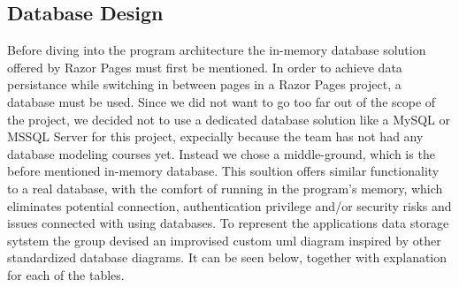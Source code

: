 \documentclass[12pt]{report}
\begin{document}



\subsection*{Database Design}
\label{sec:database}
Before diving into the program architecture the in-memory database solution offered by Razor Pages must first be mentioned.
In order to achieve data persistance while switching in between pages in a Razor Pages project, a database must be used. 
Since we did not want to go too far out of the scope of the project, we decided not to use a dedicated database solution
like a MySQL or MSSQL Server for this project, expecially because the team has not had any database modeling courses
yet. Instead we chose a middle-ground, which is the before mentioned in-memory database. This soultion offers similar functionality
to a real database, with the comfort of running in the program's memory, which eliminates potential connection, authentication
privilege and/or security risks and issues connected with using databases. To represent the applications data storage sytstem
the group devised an improvised custom uml diagram inspired by other standardized database diagrams. It can be seen below, together with
explanation for each of the tables.


\end{document}
